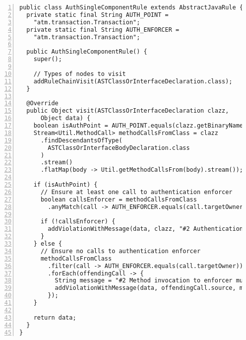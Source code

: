 \begin{lstlisting}[caption={Constraint 2.}, captionpos=b, label=lst:pmd_2, numbers=left, showstringspaces=false]
public class AuthSingleComponentRule extends AbstractJavaRule {
  private static final String AUTH_POINT =
    "atm.transaction.Transaction";
  private static final String AUTH_ENFORCER =
    "atm.transaction.Transaction";

  public AuthSingleComponentRule() {
    super();

    // Types of nodes to visit
    addRuleChainVisit(ASTClassOrInterfaceDeclaration.class);
  }

  @Override
  public Object visit(ASTClassOrInterfaceDeclaration clazz,
      Object data) {
    boolean isAuthPoint = AUTH_POINT.equals(clazz.getBinaryName());
    Stream<Util.MethodCall> methodCallsFromClass = clazz
      .findDescendantsOfType(
        ASTClassOrInterfaceBodyDeclaration.class
      )
      .stream()
      .flatMap(body -> Util.getMethodCallsFrom(body).stream());

    if (isAuthPoint) {
      // Ensure at least one call to authentication enforcer
      boolean callsEnforcer = methodCallsFromClass
        .anyMatch(call -> AUTH_ENFORCER.equals(call.targetOwner));

      if (!callsEnforcer) {
        addViolationWithMessage(data, clazz, "#2 Authentication point must call authentication enforcer");
      }
    } else {
      // Ensure no calls to authentication enforcer
      methodCallsFromClass
        .filter(call -> AUTH_ENFORCER.equals(call.targetOwner))
        .forEach(offendingCall -> {
          String message = "#2 Method invocation to enforcer must be performed at auth point";
          addViolationWithMessage(data, offendingCall.source, message);
        });
    }

    return data;
  }
}

\end{lstlisting}

